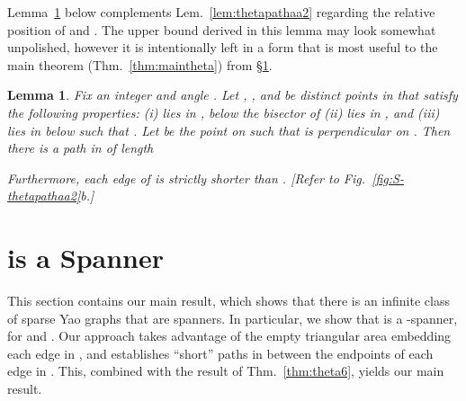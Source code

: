 \documentclass[11pt]{article}
\newtheorem{lemma}[theorem]{Lemma}
\begin{document}
\noindent
Lemma~\ref{lem:thetapathaa3} below complements Lem.~\ref{lem:thetapathaa2} regarding the relative position of  and . The upper bound derived in this lemma may look somewhat unpolished, however it is intentionally left in a form that is most useful to the main theorem (Thm.~\ref{thm:maintheta}) from \S\ref{sec:main}.
\begin{lemma}
Fix an integer  and angle . Let , ,  and  be distinct points in  that satisfy the following properties: (i)  lies in , below the bisector of  (ii)  lies in ,
and (iii)  lies in  below  such that .
Let  be the point on  such that  is perpendicular on . Then there is a path  in  of length

Furthermore, each edge of  is strictly shorter than .
\emph{[Refer to Fig.~\ref{fig:S-thetapathaa2}b.]}
\label{lem:thetapathaa3}
\end{lemma}


\section{ is a Spanner}
\label{sec:main}
This section contains our main result, which shows that there is an infinite class of sparse Yao graphs that are spanners. In particular, we show that  is a -spanner, for  and . Our approach takes advantage of the empty triangular area embedding each edge in , and establishes ``short'' paths in  between the endpoints of each edge in . This, combined with the result of Thm.~\ref{thm:theta6}, yields our main result.
\end{document}
